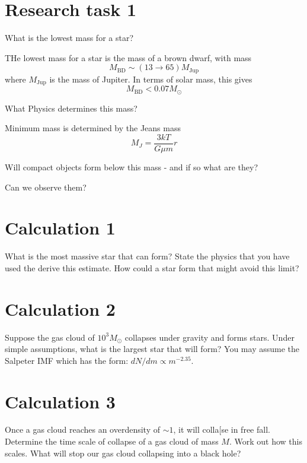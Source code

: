 \documentclass[a4paper]{article} %
\begin{document}
\section{Research task 1}
\begin{framed}
What is the lowest mass for a star? 
\end{framed}

THe lowest mass for a star is the mass of a brown dwarf, with mass
\begin{equation}
M_{\text{BD}}\sim (13\to 65) M_{\text{Jup}}
\end{equation}
where $M_{\text{Jup}}$ is the mass of Jupiter. In terms of solar mass, this gives
\begin{equation}
M_{\text{BD}} < 0.07M_{\odot}
\end{equation}

\begin{framed}
What Physics determines this mass?
\end{framed}

Minimum mass is determined by the Jeans mass
\begin{equation}
M_J=\frac{3kT}{G\mu m}r
\end{equation}


\begin{framed}
Will compact objects form below this mass - and if so what are they?
\end{framed}

\begin{framed}
Can we observe them?
\end{framed}


\section{Calculation 1}
\begin{framed}
What is the most massive star that can form? State the physics that you have used the derive this estimate. How could a star form that might avoid this limit?
\end{framed}

\section{Calculation 2}
\begin{framed}
Suppose the gas cloud of $10^3 M_{\odot}$ collapses under gravity and forms stars. Under simple assumptions, what is the largest star that will form? You may assume the Salpeter IMF which has the form: $dN/dm\propto m^{-2.35}$.
\end{framed}

\section{Calculation 3}
\begin{framed}
Once a gas cloud reaches an overdensity of $\sim 1$, it will colla[se in free fall. Determine the time scale of collapse of a gas cloud of mass $M$. Work out how this scales. What will stop our gas cloud collapsing into a black hole?
\end{framed}
\end{document}
